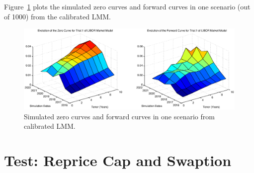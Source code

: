 Figure~\ref{fig::sim_zero_forward} plots the simulated zero curves and forward curves in one scenario (out of 1000) from the calibrated LMM.

\begin{center}
  \begin{figure}
      \includegraphics[scale=0.6]{sim_zero_forward.eps}
      \caption{Simulated zero curves and forward curves in one scenario from calibrated LMM.}\label{fig::sim_zero_forward}
  \end{figure}
\end{center}


\section{Test: Reprice Cap and Swaption} 